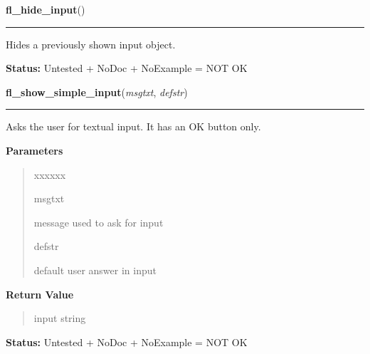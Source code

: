 \hspace{.8\funcindent}\begin{boxedminipage}{\funcwidth}

    \raggedright \textbf{fl\_hide\_input}()

    \vspace{-1.5ex}

    \rule{\textwidth}{0.5\fboxrule}
\setlength{\parskip}{2ex}
    Hides a previously shown input object.

\setlength{\parskip}{1ex}
\textbf{Status:} Untested + NoDoc + NoExample = NOT OK



    \end{boxedminipage}

    \label{xformslib:library:fl_show_simple_input}

    \vspace{0.5ex}

\hspace{.8\funcindent}\begin{boxedminipage}{\funcwidth}

    \raggedright \textbf{fl\_show\_simple\_input}(\textit{msgtxt}, \textit{defstr})

    \vspace{-1.5ex}

    \rule{\textwidth}{0.5\fboxrule}
\setlength{\parskip}{2ex}
    Asks the user for textual input. It has an OK button only.

\setlength{\parskip}{1ex}
      \textbf{Parameters}
      \vspace{-1ex}

      \begin{quote}
        \begin{Ventry}{xxxxxx}

          \item[msgtxt]

          message used to ask for input

          \item[defstr]

          default user answer in input

        \end{Ventry}

      \end{quote}

      \textbf{Return Value}
    \vspace{-1ex}

      \begin{quote}
      input string

      \end{quote}

\textbf{Status:} Untested + NoDoc + NoExample = NOT OK



    \end{boxedminipage}

